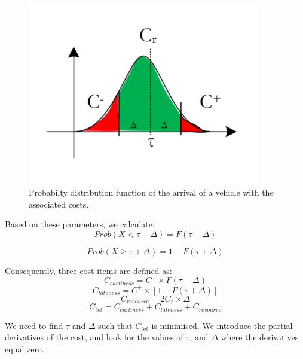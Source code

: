 \begin{figure}[hbt!]
\centering
\includegraphics[width=0.9\textwidth]{SectionDistribution/design_figures/fig_time_window.png}
\captionsetup{type=figure}
\caption{Probabilty distribution function of the arrival of a vehicle with the associated costs.}
\label{fig_time_window}
\end{figure}

Based on these parameters, we calculate:
\begin{equation}
    Prob(X<\tau-\Delta)=F(\tau-\Delta)
\end{equation}

\begin{equation}
   Prob(X\geq \tau +\Delta)=1 - F(\tau+\Delta)
\end{equation}

Consequently, three cost items are defined as:
\begin{equation}
   C_{earliness}=C^{-}\times F(\tau-\Delta)
\end{equation}
\begin{equation}
   C_{lateness}=C^{+}\times[1-F(\tau+\Delta)]
\end{equation}
\begin{equation}
   C_{resource}={2C}_r\times \Delta
\end{equation}
\begin{equation}
   C_{tot}=C_{earliness}+C_{lateness}+C_{resource}
\end{equation}

We need to find $\tau$ and $\Delta$ such that $C_{tot}$ is minimised. We introduce the partial derivatives of the cost, and look for the values of $\tau$, and $\Delta$ where the derivatives equal zero.

